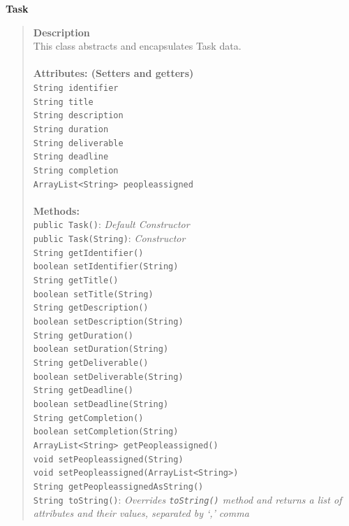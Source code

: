\documentclass[12pt]{article}
\begin{document}
{\bf Task}
\begin{quote}
{\bf Description}\\
This class abstracts and encapsulates Task data.\\\\
{\bf Attributes: (Setters and getters)}\\
\texttt{String identifier}\\
\texttt{String title}\\
\texttt{String description}\\
\texttt{String duration}\\
\texttt{String deliverable}\\
\texttt{String deadline}\\
\texttt{String completion}\\
\texttt{ArrayList<String> peopleassigned }\\\\
{\bf Methods:}\\
\texttt{public Task()}:   \emph{Default Constructor}\\
\texttt{public Task(String)}:   \emph{Constructor}\\
\texttt{String getIdentifier()  }\\
\texttt{boolean setIdentifier(String)  }\\
\texttt{String getTitle()  }\\
\texttt{boolean setTitle(String)  }\\
\texttt{String getDescription()  }\\
\texttt{boolean setDescription(String)  }\\
\texttt{String getDuration() }\\
\texttt{boolean setDuration(String)  }\\
\texttt{String getDeliverable() }\\
\texttt{boolean setDeliverable(String) }\\
\texttt{String getDeadline()  }\\
\texttt{boolean setDeadline(String) }\\
\texttt{String getCompletion() }\\
\texttt{boolean setCompletion(String) }\\
\texttt{ArrayList<String> getPeopleassigned() }\\
\texttt{void setPeopleassigned(String)  }\\
\texttt{void setPeopleassigned(ArrayList<String>) }\\
\texttt{String getPeopleassignedAsString()  }\\
\texttt{String toString()}: \emph{Overrides \texttt{toString()} method and returns a list of attributes and their values, separated by `,' comma}
\end{quote}
\end{document}
